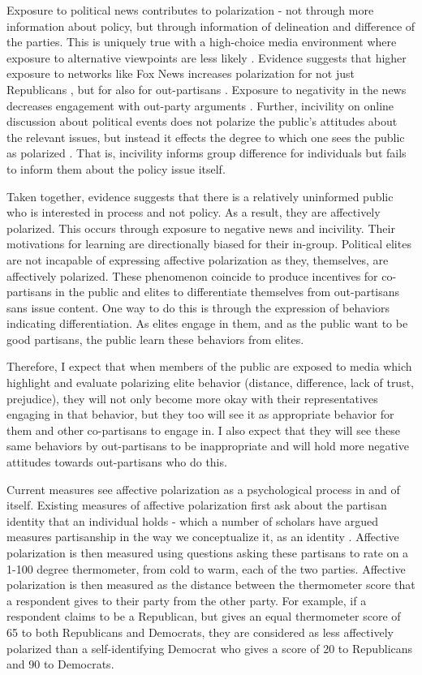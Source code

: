 \documentclass [12pt]{article}
\begin{document}
Exposure to political news contributes to polarization - not through more information about policy, but through information of delineation and difference of the parties. This is uniquely true with a high-choice media environment where exposure to alternative viewpoints are less likely \citep{prior_2007}. Evidence suggests that higher exposure to networks like Fox News increases polarization for not just Republicans \citep{licari_2020}, but for also for out-partisans \citep{webster_abramowitz_2017}. Exposure to negativity in the news decreases engagement with out-party arguments \citep{muddiman_et-al_2020}. Further, incivility on online discussion about political events does not polarize the public's attitudes about the relevant issues, but instead it effects the degree to which one sees the public as polarized \citep{hwang_et-al_2014}. That is, incivility informs group difference for individuals but fails to inform them about the policy issue itself.

Taken together, evidence suggests that there is a relatively uninformed public who is interested in process and not policy. As a result, they are affectively polarized. This occurs through exposure to negative news and incivility. Their motivations for learning are directionally biased for their in-group. Political elites are not incapable of expressing affective polarization as they, themselves, are affectively polarized. These phenomenon coincide to produce incentives for co-partisans in the public and elites to differentiate themselves from out-partisans sans issue content. One way to do this is through the expression of behaviors indicating differentiation. As elites engage in them, and as the public want to be good partisans, the public learn these behaviors from elites.

Therefore, I expect that when members of the public are exposed to media which highlight and evaluate polarizing elite behavior (distance, difference, lack of trust, prejudice), they will not only become more okay with their representatives engaging in that behavior, but they too will see it as appropriate behavior for them and other co-partisans to engage in. I also expect that they will see these same behaviors by out-partisans to be inappropriate and will hold more negative attitudes towards out-partisans who do this.

Current measures see affective polarization as a psychological process in and of itself. Existing measures of affective polarization first ask about the partisan identity that an individual holds - which a number of scholars have argued measures partisanship in the way we conceptualize it, as an identity \citep{campbell_et-al_1969, schickler_green_1997}. Affective polarization is then measured using questions asking these partisans to rate on a 1-100 degree thermometer, from cold to warm, each of the two parties. Affective polarization is then measured as the distance between the thermometer score that a respondent gives to their party from the other party. For example, if a respondent claims to be a Republican, but gives an equal thermometer score of 65 to both Republicans and Democrats, they are considered as less affectively polarized than a self-identifying Democrat who gives a score of 20 to Republicans and 90 to Democrats. 
\end{document}
